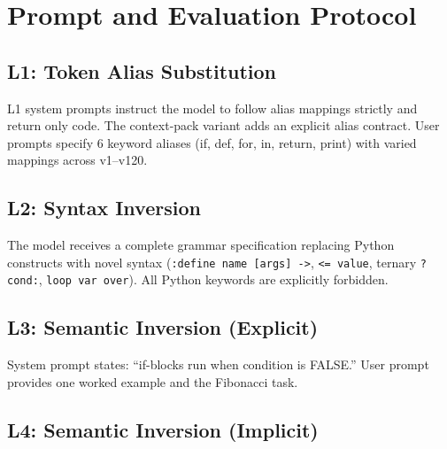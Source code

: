 \section{Prompt and Evaluation Protocol}

\subsection{L1: Token Alias Substitution}
L1 system prompts instruct the model to follow alias mappings strictly and return only code. The context-pack variant adds an explicit alias contract. User prompts specify 6 keyword aliases (if, def, for, in, return, print) with varied mappings across v1--v120.

\subsection{L2: Syntax Inversion}
The model receives a complete grammar specification replacing Python constructs with novel syntax (\texttt{:define name [args] ->}, \texttt{<= value}, ternary \texttt{?cond:}, \texttt{loop var over}). All Python keywords are explicitly forbidden.

\subsection{L3: Semantic Inversion (Explicit)}
System prompt states: ``if-blocks run when condition is FALSE.'' User prompt provides one worked example and the Fibonacci task.

\subsection{L4: Semantic Inversion (Implicit)}

